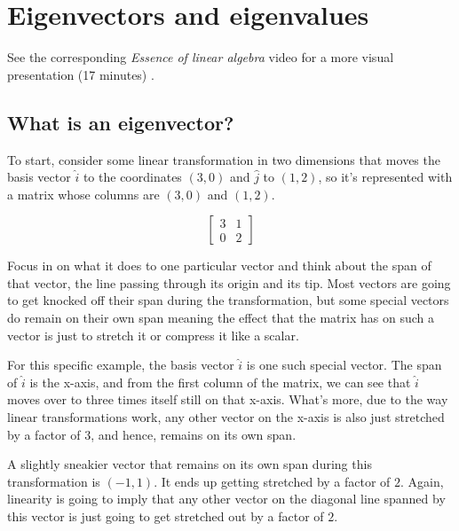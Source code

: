 \section{Eigenvectors and eigenvalues}

\begin{remark}
  See the corresponding \textit{Essence of linear algebra} video for a more
  visual presentation (17 minutes)
  \cite{bib:linalg_eigenvectors_and_eigenvalues}.
\end{remark}

\subsection{What is an eigenvector?}

To start, consider some linear transformation in two dimensions that moves the
basis vector $\hat{i}$ to the coordinates $(3, 0)$ and $\hat{j}$ to $(1, 2)$, so
it's represented with a matrix whose columns are $(3, 0)$ and $(1, 2)$.

\begin{equation*}
  \begin{bmatrix}
    3 & 1 \\
    0 & 2
  \end{bmatrix}
\end{equation*}

Focus in on what it does to one particular vector and think about the span of
that vector, the line passing through its origin and its tip. Most vectors are
going to get knocked off their span during the transformation, but some special
vectors do remain on their own span meaning the effect that the matrix has on
such a vector is just to stretch it or compress it like a scalar.

For this specific example, the basis vector $\hat{i}$ is one such special
vector. The span of $\hat{i}$ is the x-axis, and from the first column of the
matrix, we can see that $\hat{i}$ moves over to three times itself still on that
x-axis. What's more, due to the way linear transformations work, any other
vector on the x-axis is also just stretched by a factor of $3$, and hence,
remains on its own span.

A slightly sneakier vector that remains on its own span during this
transformation is $(-1, 1)$. It ends up getting stretched by a factor of $2$.
Again, linearity is going to imply that any other vector on the diagonal line
spanned by this vector is just going to get stretched out by a factor of $2$.

